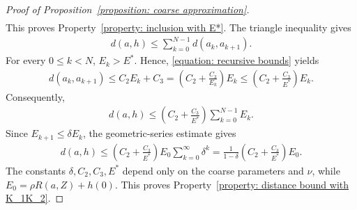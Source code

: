 \documentclass[10pt,a4paper]{amsart}
\begin{document}
\begin{proof}[Proof of Proposition~\ref{proposition: coarse approximation}]
\begin{align*}
    \end{align*}
    This proves Property~\ref{property: inclusion with E*}. The triangle inequality gives
    \begin{align*}
        d(a,h)\le \sum_{k=0}^{N-1} d(a_k,a_{k+1}).
    \end{align*}
    For every $0\le k<N$, $E_k>E^*$. Hence, \eqref{equation: recursive bounds} yields
    \begin{align*}
        d(a_k,a_{k+1})\le C_2 E_k+C_3=\left(C_2+\frac{C_3}{E_k}\right)E_k\le \left(C_2+\frac{C_3}{E^*}\right)E_k.
    \end{align*}
    Consequently,
    \begin{align*}
        d(a,h)\le \left(C_2+\frac{C_3}{E^*}\right) \sum_{k=0}^{N-1}E_k.
    \end{align*}
    Since $E_{k+1}\le\delta E_k$, the geometric-series estimate gives
    \begin{align*}
        d(a,h)\le \left(C_2+\frac{C_3}{E^*}\right)E_0 \sum_{k=0}^{\infty}\delta^k=\frac{1}{1-\delta}\left(C_2+\frac{C_3}{E^*}\right)E_0.
    \end{align*}
    The constants $\delta,C_2,C_3,E^*$ depend only on the coarse parameters and $\nu$, while $E_0=\rho R(a,Z)+h(0)$. This proves Property~\ref{property: distance bound with K_1K_2}.
\end{proof}
\end{document}
